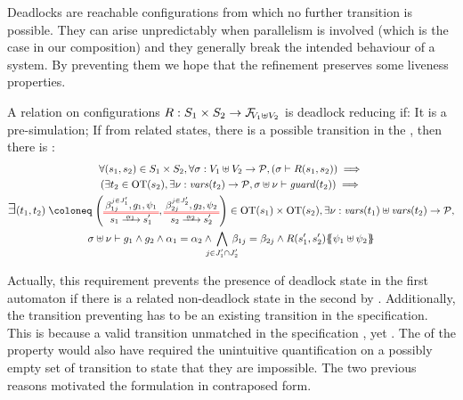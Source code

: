 \documentclass{article}
\begin{document}
Deadlocks are reachable configurations from which no further transition is possible.
They can arise unpredictably when parallelism is involved (which is the case in our composition) and they generally break the intended behaviour of a system.
By preventing them we  hope that the refinement preserves some liveness properties.
\begin{defi}
A relation on configurations \(R: S_1 \times S_2 \to \rformulas[V_1 \uplus V_2]\) is deadlock reducing if:
 It is a pre-simulation;
 If from related states, there is a possible transition in the , then there is :
\begin{multline*}
	\forall \mpar{s_1, s_2} \in S_1 \times S_2, \forall \sigma: V_1 \uplus V_2 \to \values, \mpar{\sigma \vdash R\mpar{s_1, s_2}} \implies \\
	\mpar{\exists t_2 \in \fOT{s_2}, \exists \nu: \fvars{t_2} \to \values, \sigma \uplus \nu \vdash \fguard{t_2}} \implies \\
	\bigsymb{\exists} \mpar{t_1, t_2} \defobject \mpar{\OTx{1}{}{1}{1}, \OTx{2}{}{2}{2}} \in \fOT{s_1} \times \fOT{s_2}, \exists \nu: \fvars{t_1} \uplus \fvars{t_2} \to \values, \\
	\sigma \uplus \nu \vdash g_1 \wedge g_2 \wedge \alpha_1 = \alpha_2 \wedge \bigwedge_\subbox{j \in J'_1 \cap J'_2} \beta_{1j} = \beta_{2j} \wedge R\mpar{s'_1, s'_2}\psubst{\psi_1 \uplus \psi_2}
\end{multline*}
\end{defi}
Actually, this requirement prevents the presence of deadlock state in the first automaton if there is a related non-deadlock state in the second by .
Additionally, the transition preventing  has to be an existing transition in the specification.
This is because a valid transition unmatched in the specification , yet .
The  of the property would also have required the unintuitive quantification on a possibly empty set of transition to state that they are impossible.
The two previous reasons motivated the formulation in contraposed form.
\end{document}
